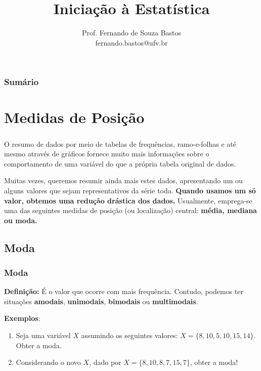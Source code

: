 \documentclass[14pt,aspectratio=1610]{beamer}
\title{Iniciação à Estatística}
\author{Prof. Fernando de Souza Bastos \texorpdfstring{\\ fernando.bastos@ufv.br}{}}
\institute{Departamento de Estatística \texorpdfstring{\\ Universidade Federal de Viçosa}{}\texorpdfstring{\\ Campus UFV - Viçosa}{}}
\date{}
\begin{document}
%

\frame{\titlepage}

\begin{frame}{}
\frametitle{\bf Sumário}
\tableofcontents
\end{frame}

\section{Medidas de Posição}
\begin{frame}{}
\frametitle{}
\begin{block}{}
\justifying
O resumo de dados por meio de tabelas de frequências, ramo-e-folhas e até mesmo através de gráficos fornece muito mais informações sobre o comportamento de uma variável do que a própria tabela original de dados. 
\nocite{roteiro}
\end{block}
\pause
\begin{block}{}
\justifying
Muitas vezes, queremos resumir ainda mais estes dados, apresentando um ou alguns valores que sejam representativos da série toda. \textbf{Quando usamos um só 
valor, obtemos uma redução drástica dos dados.} Usualmente, emprega-se uma das seguintes medidas de posição (ou localização) central: \bf{média}, \bf{mediana} ou \bf{moda}.
\end{block}
\end{frame}

\subsection{Moda}
\begin{frame}{}
\frametitle{Moda}
\begin{block}{}
\justifying
\noindent \textbf{Definição:} É o valor que ocorre com mais frequência. Contudo, podemos ter situações \textbf{amodais}, \textbf{unimodais}, \textbf{bimodais}	ou \textbf{multimodais}.
	
\noindent \textbf{Exemplos}:
	
\begin{enumerate}
	\item  Seja uma variável $X$ assumindo os seguintes valores:
		$X = \{8, 10, 5, 10, 15, 14\}$. Obter a moda.  \hspace{0.5cm}   \pause
	\item Considerando o novo $X$, dado por $X = \{8, 10, 8, 7, 15, 7\}$, obter a moda!
\end{enumerate}

\end{block}
\end{frame}
\end{document}

